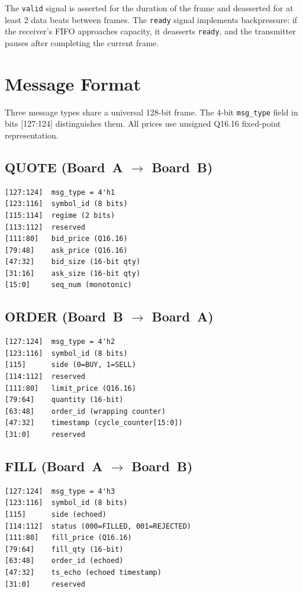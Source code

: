 \documentclass[conference]{IEEEtran}
\begin{document}
The \texttt{valid} signal is asserted for the duration of the frame and deasserted for at least 2 data beats between frames. The \texttt{ready} signal implements backpressure: if the receiver's FIFO approaches capacity, it deasserts \texttt{ready}, and the transmitter pauses after completing the current frame.

\section{Message Format}

Three message types share a universal 128-bit frame. The 4-bit \texttt{msg\_type} field in bits [127:124] distinguishes them. All prices use unsigned Q16.16 fixed-point representation.

\subsection{QUOTE (Board~A $\rightarrow$ Board~B)}

\begin{lstlisting}
[127:124]  msg_type = 4'h1
[123:116]  symbol_id (8 bits)
[115:114]  regime (2 bits)
[113:112]  reserved
[111:80]   bid_price (Q16.16)
[79:48]    ask_price (Q16.16)
[47:32]    bid_size (16-bit qty)
[31:16]    ask_size (16-bit qty)
[15:0]     seq_num (monotonic)
\end{lstlisting}

\subsection{ORDER (Board~B $\rightarrow$ Board~A)}

\begin{lstlisting}
[127:124]  msg_type = 4'h2
[123:116]  symbol_id (8 bits)
[115]      side (0=BUY, 1=SELL)
[114:112]  reserved
[111:80]   limit_price (Q16.16)
[79:64]    quantity (16-bit)
[63:48]    order_id (wrapping counter)
[47:32]    timestamp (cycle_counter[15:0])
[31:0]     reserved
\end{lstlisting}

\subsection{FILL (Board~A $\rightarrow$ Board~B)}

\begin{lstlisting}
[127:124]  msg_type = 4'h3
[123:116]  symbol_id (8 bits)
[115]      side (echoed)
[114:112]  status (000=FILLED, 001=REJECTED)
[111:80]   fill_price (Q16.16)
[79:64]    fill_qty (16-bit)
[63:48]    order_id (echoed)
[47:32]    ts_echo (echoed timestamp)
[31:0]     reserved
\end{lstlisting}
\end{document}
